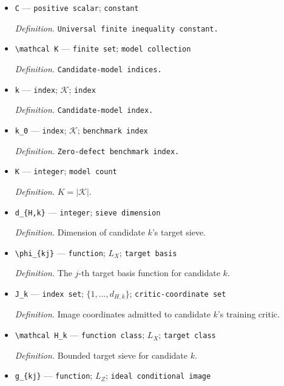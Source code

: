 \documentclass{article}
\begin{document}
\begin{itemize}
  \item \texttt{C} --- \texttt{positive scalar}; \texttt{constant}
  \par\smallskip\noindent\emph{Definition.} \texttt{Universal finite inequality constant.}
  \item \texttt{\textbackslash{}\allowbreak{}mathcal K} --- \texttt{finite set}; \texttt{model collection}
  \par\smallskip\noindent\emph{Definition.} \texttt{Candidate-\allowbreak{}model indices.}
  \item \texttt{k} --- \texttt{index}; \(\mathcal K\); \texttt{index}
  \par\smallskip\noindent\emph{Definition.} \texttt{Candidate-\allowbreak{}model index.}
  \item \texttt{k\_\allowbreak{}0} --- \texttt{index}; \(\mathcal K\); \texttt{benchmark index}
  \par\smallskip\noindent\emph{Definition.} \texttt{Zero-\allowbreak{}defect benchmark index.}
  \item \texttt{K} --- \texttt{integer}; \texttt{model count}
  \par\smallskip\noindent\emph{Definition.} \(K=|\mathcal K|\).
  \item \texttt{d\_\allowbreak{}\{H,\allowbreak{}k\}\allowbreak{}} --- \texttt{integer}; \texttt{sieve dimension}
  \par\smallskip\noindent\emph{Definition.} Dimension of candidate \(k\)'s target sieve.
  \item \texttt{\textbackslash{}\allowbreak{}phi\_\allowbreak{}\{kj\}\allowbreak{}} --- \texttt{function}; \(L_X\); \texttt{target basis}
  \par\smallskip\noindent\emph{Definition.} The \(j\)-th target basis function for candidate \(k\).
  \item \texttt{J\_\allowbreak{}k} --- \texttt{index set}; \(\{1,\ldots,d_{H,k}\}\); \texttt{critic-\allowbreak{}coordinate set}
  \par\smallskip\noindent\emph{Definition.} Image coordinates admitted to candidate \(k\)'s training critic.
  \item \texttt{\textbackslash{}\allowbreak{}mathcal H\_\allowbreak{}k} --- \texttt{function class}; \(L_X\); \texttt{target class}
  \par\smallskip\noindent\emph{Definition.} Bounded target sieve for candidate \(k\).
  \item \texttt{g\_\allowbreak{}\{kj\}\allowbreak{}} --- \texttt{function}; \(L_Z\); \texttt{ideal conditional image}

\end{itemize}
\end{document}
